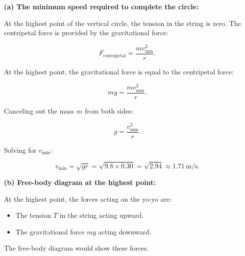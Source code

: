 \documentclass[addpoints]{exam}
\begin{document}
\begin{questions}
\begin{solution}[5cm]
\textbf{(a) The minimum speed required to complete the circle:}

At the highest point of the vertical circle, the tension in the string is zero. The centripetal force is provided by the gravitational force:

\[
F_{\text{centripetal}} = \frac{m v_{\text{min}}^2}{r}.
\]

At the highest point, the gravitational force is equal to the centripetal force:

\[
m g = \frac{m v_{\text{min}}^2}{r}.
\]

Canceling out the mass \( m \) from both sides:

\[
g = \frac{v_{\text{min}}^2}{r}.
\]

Solving for \( v_{\text{min}} \):

\[
v_{\text{min}} = \sqrt{g r} = \sqrt{9.8 \times 0.30} = \sqrt{2.94} \approx 1.71 \, \text{m/s}.
\]

\textbf{(b) Free-body diagram at the highest point:}

At the highest point, the forces acting on the yo-yo are:
\begin{itemize}
    \item The tension \( T \) in the string acting upward.
    \item The gravitational force \( mg \) acting downward.
\end{itemize}
The free-body diagram would show these forces.


\end{solution}
\end{questions}
\end{document}
